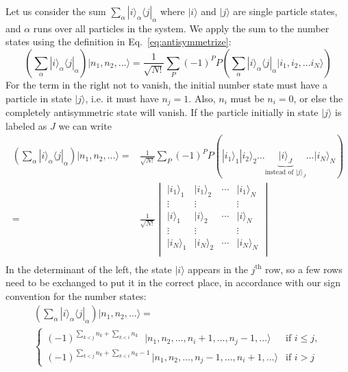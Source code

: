 Let us consider the sum $\sum_{\alpha} |i\rangle_{\alpha} \langle j | _{\alpha}
$ where $|i\rangle$ and $|j\rangle$ are single particle states, and $\alpha$
runs over all particles in the system.  We apply the sum to the number states
using the definition in Eq.~\ref{eq:antisymmetrize}: 
\begin{equation}
  \left(
   \sum_{\alpha} |i\rangle_{\alpha} \langle j | _{\alpha}  \right)
  | n_{1},  n_{2}, \ldots \rangle = 
  \frac{1}{\sqrt{N!}} \sum_{P} (- 1)^{P} P 
  \left( \sum_{\alpha} |i\rangle_{\alpha} \langle j | _{\alpha} 
   | i_{1},  i_{2}, \ldots i_{N} \rangle \right)
\end{equation}
For the term in the right not to vanish, the initial number state  must have a
particle in state $|j\rangle$, i.e. it must have $n_{j}=1$. Also, $n_{i}$ must
be $n_{i}=0$,  or else the completely antisymmetric state will vanish.  If the
particle initially in state $|j\rangle$ is labeled as  $J$  we can write
\begin{equation}
\begin{split}
  \left(
   \sum_{\alpha} |i\rangle_{\alpha} \langle j | _{\alpha}  \right)
  | n_{1},  n_{2}, \ldots \rangle = &
  \frac{1}{\sqrt{N!}} \sum_{P} (- 1)^{P} P \left( 
    |i_{1}\rangle_{1}
    |i_{2}\rangle_{2}
    \ldots 
     \!\!\!\!\!\!
    \underbrace{ 
    |i\rangle_{J} }_{\text{instead of } |j\rangle_{J}} 
     \!\!\!\!\!\!
    \ldots 
    |i_{N}\rangle_{N}
  \right) \\
   =&  
  \frac{1}{\sqrt{N!}}
  \begin{vmatrix}
  |i_{1}\rangle_{1} & |i_{1}\rangle_{2} & \dotsm & |i_{1}\rangle_{N} \\
  \vdots &  \vdots &     & \vdots \\
  |i\rangle_{1} & |i\rangle_{2} & \dotsm & |i\rangle_{N} \\
  \vdots &  \vdots &     & \vdots \\
  |i_{N}\rangle_{1} & |i_{N}\rangle_{2} & \dotsm & |i_{N}\rangle_{N} \\
\end{vmatrix} \\
\end{split} 
\end{equation}
In the determinant of the left, the state $|i\rangle$ appears in the
$j^{\text{th}}$ row, so a few rows need to be exchanged to put it in the
correct place, in accordance with our sign convention for the number states:
\begin{multline}
  \left(
   \sum_{\alpha} |i\rangle_{\alpha} \langle j | _{\alpha}  \right)
  | n_{1},  n_{2}, \ldots \rangle = \\  
 \begin{cases}
(-1)^{\sum_{k<j} n_{k} + \sum_{k<i}n_{k}~~~}
   \,| n_{1}, n_{2},  \ldots, n_{i}+1, \ldots,  n_{j}-1, \ldots  \rangle   
& \text{if $i\leq j$},\\
(-1)^{\sum_{k<j} n_{k} + \sum_{k<i}n_{k} -1 } 
   \,| n_{1}, n_{2},  \ldots, n_{j}-1, \ldots,  n_{i}+1, \ldots  \rangle
& \text{if $i>j$}
\end{cases}  
\end{multline}
